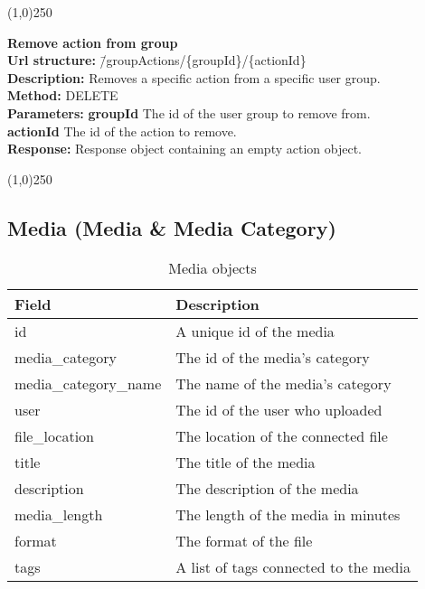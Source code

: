 \documentclass[11pt]{article}
\begin{document}
\begin{center}\line(1,0){250}\end{center}

\begin{tabbing}
\textbf{Remove action from group} \\
\textcolor{black!60}{\textbf{Url structure:}} \hspace{0.2in} \= /groupActions/\{groupId\}/\{actionId\} \\
\textcolor{black!60}{\textbf{Description:}}  \> Removes a specific action from a specific user group. \\
\textcolor{black!60}{\textbf{Method:}} \> DELETE \\
\textcolor{black!60}{\textbf{Parameters:}} \> \textbf{groupId} The id of the user group to remove from. \\
\> \textbf{actionId} The id of the action to remove. \\
\textcolor{black!60}{\textbf{Response:}} \> Response object containing an empty action object.
\end{tabbing}

\begin{center}\line(1,0){250}\end{center}

\subsection{Media (Media \& Media Category)}

\begin{table}[H]
\caption{Media objects}
\begin{center}
\begin{tabular}{|l|l|}
\hline
 Field                                          &  Description                            \\
\hline
 id                                             &  A unique id of the media               \\
 media\_category                    &  The id of the media's category         \\
 media\_category\_name  &  The name of the media's category       \\
 user                                           &  The id of the user who uploaded        \\
 file\_location                     &  The location of the connected file     \\
 title                                          &  The title of the media                 \\
 description                                    &  The description of the media           \\
 media\_length                      &  The length of the media in minutes     \\
 format                                         &  The format of the file                 \\
 tags                                           &  A list of tags connected to the media  \\
\hline
\end{tabular}
\end{center}
\end{table}
\end{document}
